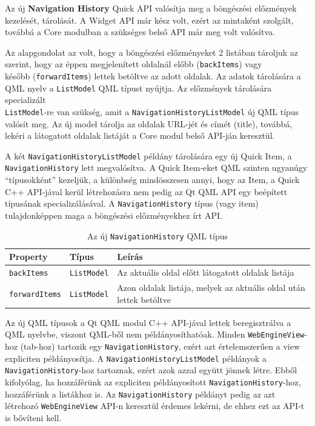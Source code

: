 \documentclass[12pt]{report}
\begin{document}
\noindent
Az új \textbf{Navigation History} Quick API valósítja meg a böngészési előzmények kezelését,
tárolását. A Widget API már kész volt, ezért az mintaként szolgált, továbbá a Core modulban
a szükséges belső API már meg volt valósítva.

Az alapgondolat az volt, hogy a böngészési előzményeket 2 listában tároljuk az szerint,
hogy az éppen megjelenített oldalnál előbb (\texttt{backItems}) vagy \\
később (\texttt{forwardItems}) lettek betöltve az adott oldalak. Az adatok tárolására
a QML nyelv a \texttt{ListModel} QML típust nyújtja. Az előzmények tárolására specializált \\
\texttt{ListModel}-re van szükség, amit a \texttt{NavigationHistoryListModel} új QML típus
valósít meg. Az új model tárolja az oldalak URL-jét és címét (title), továbbá, lekéri
a látogatott oldalak listáját a Core modul belső API-ján keresztül.

A két \texttt{NavigationHistoryListModel} példány tárolására
egy új Quick Item, a \texttt{NavigationHistory} lett megvalósítva. A Quick Item-eket QML
szinten ugyanúgy ``típusokként'' kezeljük, a különbség mindösszesen annyi, hogy az Item,
a Quick C++ API-jával kerül létrehozásra nem pedig az Qt QML API egy beépített típusának
specializálásával. A \texttt{NavigationHistory} típus (vagy item) tulajdonképpen maga a
böngészési előzményekhez írt API.

\begin{table}[ht!]
    \centering
    \begin{tabular}{ | l | l | p{238pt} | }
        \hline
        \textbf{Property} & \textbf{Típus} & \textbf{Leírás} \\ \hline

        \texttt{backItems} & \texttt{ListModel} &
        Az aktuális oldal előtt látogatott oldalak listája
        \\ \hline

        \texttt{forwardItems} & \texttt{ListModel} &
        Azon oldalak listája, melyek az aktuális oldal után lettek betöltve
        \\ \hline
    \end{tabular}
    \caption{
        \label{tab:navigation-history-history-api}
        Az új \texttt{NavigationHistory} QML típus
    }
\end{table}

Az új QML típusok a Qt QML modul C++ API-jával lettek beregisztrálva a QML nyelvbe, viszont
QML-ből nem példányosíthatóak. Minden \texttt{WebEngineView}-hoz (tab-hoz) tartozik egy
\texttt{NavigationHistory}, ezért azt értelemszerűen a view expliciten példányosítja.
A \texttt{NavigationHistoryListModel} példányok a \\
\texttt{NavigationHistory}-hoz tartoznak, ezért azok azzal együtt jönnek létre.
Ebből kifolyólag, ha hozzáférünk az expliciten példányosított \texttt{NavigationHistory}-hoz,
hozzáférünk a listákhoz is. Az \texttt{NavigationHistory} példányt pedig az azt létrehozó
\texttt{WebEngineView} API-n keresztül érdemes lekérni, de ehhez ezt az API-t is bővíteni
kell.
\end{document}
